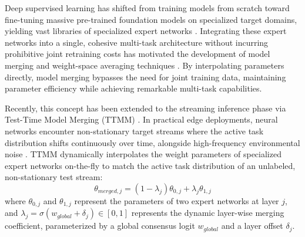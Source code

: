 \documentclass{article}
\theoremstyle{plain}
\theoremstyle{definition}
\theoremstyle{remark}
\begin{document}
Deep supervised learning has shifted from training models from scratch toward fine-tuning massive pre-trained foundation models on specialized target domains, yielding vast libraries of specialized expert networks \cite{wortsman2022robust, he2016deep, devlin2019bert, radford2021learning}. Integrating these expert networks into a single, cohesive multi-task architecture without incurring prohibitive joint retraining costs has motivated the development of model merging and weight-space averaging techniques \cite{ilharco2023task, yadav2023ties, ainsworth2023git, yang2023regmean, matena2022merging, stoica2023zipit, jin2023dataless, yu2024language}. By interpolating parameters directly, model merging bypasses the need for joint training data, maintaining parameter efficiency while achieving remarkable multi-task capabilities.

Recently, this concept has been extended to the streaming inference phase via Test-Time Model Merging (TTMM) \cite{yang2024test, niu2023towards}. In practical edge deployments, neural networks encounter non-stationary target streams where the active task distribution shifts continuously over time, alongside high-frequency environmental noise \cite{yuan2023rotta, gong2022note, zhang2022memo}. TTMM dynamically interpolates the weight parameters of specialized expert networks on-the-fly to match the active task distribution of an unlabeled, non-stationary test stream:
\begin{equation}
  \theta_{merged, j} = (1 - \lambda_j) \theta_{0, j} + \lambda_j \theta_{1, j}
\end{equation}
where $\theta_{0, j}$ and $\theta_{1, j}$ represent the parameters of two expert networks at layer $j$, and $\lambda_j = \sigma(w_{global} + \delta_j) \in [0, 1]$ represents the dynamic layer-wise merging coefficient, parameterized by a global consensus logit $w_{global}$ and a layer offset $\delta_j$.
\end{document}
